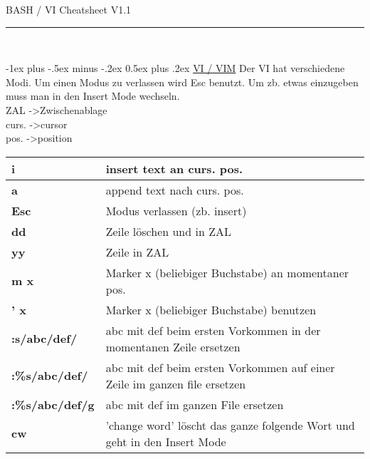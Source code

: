 \documentclass[a4paper,10pt,landscape]{article}
\makeatletter
\renewcommand{\section}{\@startsection{section}{1}{0mm}%
                                {-1ex plus -.5ex minus -.2ex}%
                                {0.5ex plus .2ex}%
                                {\normalfont\large\bfseries}}
\makeatother
\begin{document}
\begin{center}
     \Large{BASH / VI Cheatsheet}  \footnotesize{V1.1} \\
\rule{\linewidth}{0.25pt}\\
\end{center}


\raggedright
\begin{multicols}{2}
\footnotesize


\setlength{\premulticols}{1pt}
\setlength{\postmulticols}{1pt}
\setlength{\multicolsep}{1pt}
\setlength{\columnsep}{2pt}

\section{\underline{VI / VIM}}
\vspace{3mm}
Der VI hat verschiedene Modi. Um einen Modus zu verlassen wird Esc benutzt. Um zb. etwas einzugeben muss man in den Insert Mode wechseln.\\
\vspace{2mm}
ZAL -\textgreater Zwischenablage\\
curs. -\textgreater cursor\\
pos. -\textgreater position\\
\vspace{2mm}
\begin{tabular}{l p{8cm}}
{\bf i} & insert text an curs. pos.\\\hline
{\bf a} & append text nach curs. pos.\\\hline
{\bf Esc} & Modus verlassen (zb. insert)\\\hline
{\bf dd} &  Zeile löschen und in ZAL\\\hline
{\bf yy} &  Zeile in ZAL\\\hline
{\bf m x} &  Marker x (beliebiger Buchstabe) an momentaner pos.\\\hline
{\bf ' x} &  Marker x (beliebiger Buchstabe) benutzen\\\hline
{\bf :s/abc/def/} & abc mit def beim ersten Vorkommen in der momentanen Zeile ersetzen\\\hline
{\bf :\%s/abc/def/} & abc mit def beim ersten Vorkommen auf einer Zeile im ganzen file ersetzen\\\hline
{\bf :\%s/abc/def/g} & abc mit def im ganzen File ersetzen\\\hline
{\bf cw} & 'change word' löscht das ganze folgende Wort und geht in den Insert Mode\\\hline

\end{tabular}
\end{multicols}
\end{document}

